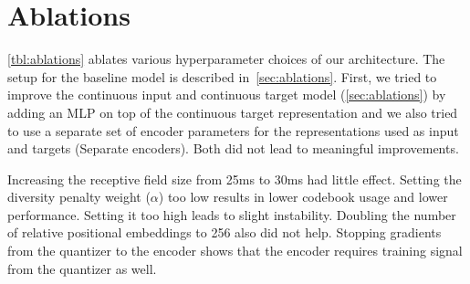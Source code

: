 \documentclass{article}
\begin{document}
\newpage
\section{Ablations}
\label{app:ablations}

\autoref{tbl:ablations} ablates various hyperparameter choices of our architecture. The setup for the baseline model is described in~\autoref{sec:ablations}. 
First, we tried to improve the continuous input and continuous target model (\autoref{sec:ablations}) by adding an MLP on top of the continuous target representation and we also tried to use a separate set of encoder parameters for the representations used as input and targets (Separate encoders). 
Both did not lead to meaningful improvements.

Increasing the receptive field size from 25ms to 30ms had little effect.
Setting the diversity penalty weight ($\alpha{}$) too low results in lower codebook usage and lower performance.
Setting it too high leads to slight instability.
Doubling the number of relative positional embeddings to 256 also did not help.
Stopping gradients from the quantizer to the encoder shows that the encoder requires training signal from the quantizer as well.
\end{document}

